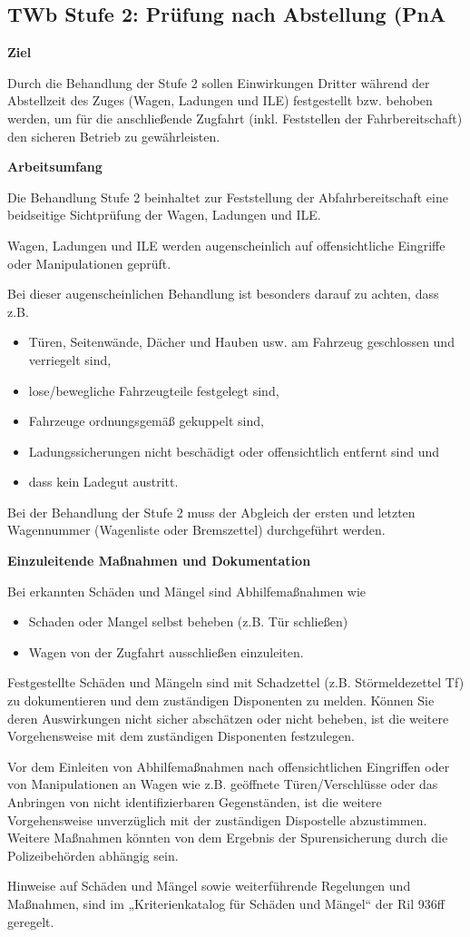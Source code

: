 \subsection{TWb Stufe 2: Prüfung nach Abstellung (PnA}
\textbf{Ziel}\par
Durch die Behandlung der Stufe 2 sollen Einwirkungen Dritter während der Abstellzeit des Zuges (Wagen, Ladungen und ILE) festgestellt bzw. behoben werden, um für die anschließende Zugfahrt (inkl. Feststellen der Fahrbereitschaft) den sicheren Betrieb zu gewährleisten.\par
\textbf{Arbeitsumfang}\par
Die Behandlung Stufe 2 beinhaltet zur Feststellung der
Abfahrbereitschaft eine beidseitige Sichtprüfung der Wagen,
Ladungen und ILE. \par
Wagen, Ladungen und ILE werden augenscheinlich auf offensichtliche
Eingriffe oder Manipulationen geprüft.\par
Bei dieser augenscheinlichen Behandlung ist besonders
darauf zu achten, dass z.B.
\begin{itemize}
    \item Türen, Seitenwände, Dächer und Hauben usw. am Fahrzeug geschlossen und verriegelt sind,
    \item lose/bewegliche Fahrzeugteile festgelegt sind,
    \item Fahrzeuge ordnungsgemäß gekuppelt sind,
    \item Ladungssicherungen nicht beschädigt oder offensichtlich entfernt sind und
    \item dass kein Ladegut austritt.
\end{itemize}
Bei der Behandlung der Stufe 2 muss der Abgleich der ersten und letzten Wagennummer (Wagenliste oder Bremszettel) durchgeführt werden.\par
\textbf{Einzuleitende Maßnahmen und Dokumentation}\par
Bei erkannten Schäden und Mängel sind Abhilfemaßnahmen wie
\begin{itemize}
    \item Schaden oder Mangel selbst beheben (z.B. Tür schließen)
    \item Wagen von der Zugfahrt ausschließen einzuleiten.
\end{itemize}
Festgestellte Schäden und Mängeln sind mit Schadzettel (z.B. Störmeldezettel Tf) zu dokumentieren und dem zuständigen Disponenten zu melden. Können Sie deren Auswirkungen nicht sicher abschätzen oder nicht beheben, ist die weitere Vorgehensweise mit dem zuständigen Disponenten festzulegen.\par
Vor dem Einleiten von Abhilfemaßnahmen nach offensichtlichen Eingriffen oder von Manipulationen an Wagen wie z.B. geöffnete Türen/Verschlüsse oder das Anbringen
von nicht identifizierbaren Gegenständen, ist die weitere Vorgehensweise unverzüglich mit der zuständigen Dispostelle abzustimmen. Weitere Maßnahmen könnten von dem Ergebnis der Spurensicherung durch die Polizeibehörden abhängig sein. \par
Hinweise auf Schäden und Mängel sowie weiterführende Regelungen und Maßnahmen, sind im „Kriterienkatalog für Schäden und Mängel“ der Ril 936ff geregelt.\par
